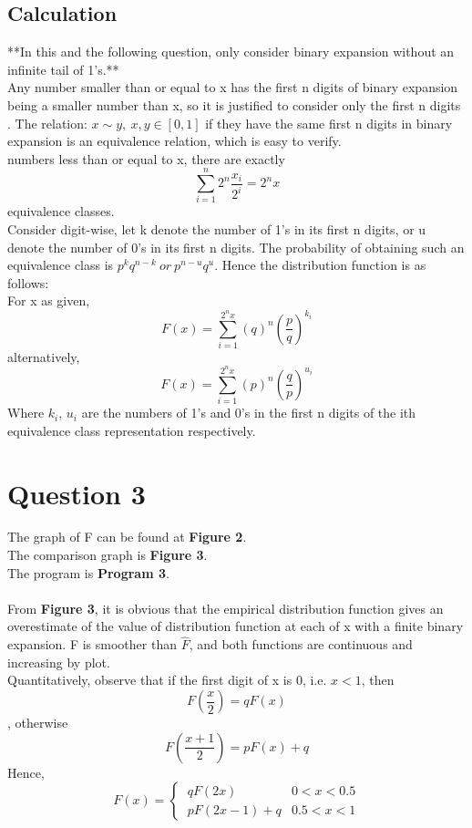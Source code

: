 \documentclass[11pt]{article}
\begin{document}
\subsection*{Calculation}
**In this and the following question, only consider binary expansion without an infinite tail of 1's.**\\
Any number smaller than or equal to x has the first n digits of binary expansion being a smaller number than x, so it is justified to consider only the first n digits .  
The relation: $x \sim y,\ x,y\in \left[0,1\right]$ if they have the same first n digits in binary expansion  is an equivalence relation, which is easy to verify. \\
 numbers less than or equal to x, there are exactly $$\sum_{i=1}^{n}2^{n}\frac{x_{i}}{2^{i}}=2^nx
$$ 
equivalence classes.  \\Consider digit-wise, let k denote the number of 1's in its first n digits, or u denote the number of 0's in its first n digits. The probability of obtaining such an equivalence class is $p^{k}q^{n-k}\ or\ p^{n-u}q^{u}.$
Hence the distribution function is as follows:\\
For x as given, 
$$F\left(x\right)=\sum_{i=1}^{2^{n}x}(q)^n(\frac{p}{q})^{k_{i}}$$
alternatively,
$$F\left(x\right)=\sum_{i=1}^{2^{n}x}(p)^n(\frac{q}{p})^{u_{i}}$$
Where $k_{i}$, $u_{i}$ are the numbers  of 1's and 0's in the first n digits of the ith equivalence class representation respectively.
\section*{Question 3}
\label{sec:Question 3}
The graph of F can be found at \textbf{Figure 2}.\\
The comparison graph is \textbf{Figure 3}.\\
The program is \textbf{Program 3}.\\\\
From \textbf{Figure 3}, it is obvious that the empirical distribution function gives an overestimate of the value of distribution function at each of x with a finite binary expansion. F is smoother than $\hat{F}$, and both functions are continuous and increasing by plot.\\ Quantitatively, observe that if the first digit of x is 0, i.e. $x<1$, then  $$F(\frac{x}{2})=qF(x)$$, otherwise $$F(\frac{x+1}{2})=pF(x)+q$$
Hence, 
\[F(x) = 
\begin{cases}
\ qF(2x)       & 0<x<0.5\\
\ pF(2x-1)+ q  & 0.5<x<1
\end{cases}\]
\end{document}
